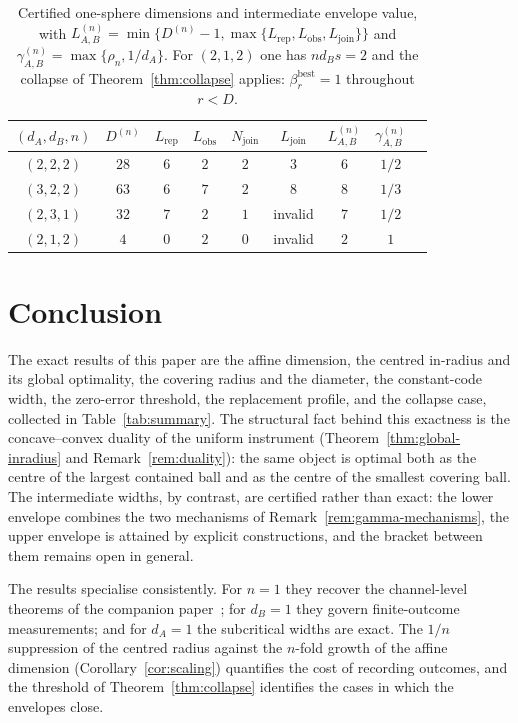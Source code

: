 \documentclass[11pt,a4paper]{article}
\begin{document}
\begin{table}[t]
\centering
\small
\setlength{\tabcolsep}{4pt}
\begin{tabular}{ccccccccc}
\toprule
$(d_A,d_B,n)$ & $D^{(n)}$ & $L_{\mathrm{rep}}$ & $L_{\mathrm{obs}}$ & $N_{\mathrm{join}}$ & $L_{\mathrm{join}}$ & $L_{A,B}^{(n)}$ & $\gamma_{A,B}^{(n)}$\\
\midrule
$(2,2,2)$ & $28$ & $6$ & $2$ & $2$ & $3$ & $6$ & $1/2$\\
$(3,2,2)$ & $63$ & $6$ & $7$ & $2$ & $8$ & $8$ & $1/3$\\
$(2,3,1)$ & $32$ & $7$ & $2$ & $1$ & invalid & $7$ & $1/2$\\
$(2,1,2)$ & $4$  & $0$ & $2$ & $0$ & invalid & $2$ & $1$\\
\bottomrule
\end{tabular}
\caption{Certified one-sphere dimensions and intermediate envelope value, with $L_{A,B}^{(n)}=\min\{D^{(n)}-1,\max\{L_{\mathrm{rep}},L_{\mathrm{obs}},L_{\mathrm{join}}\}\}$ and $\gamma_{A,B}^{(n)}=\max\{\rho_n,1/d_A\}$. For $(2,1,2)$ one has $nd_Bs=2$ and the collapse of Theorem~\ref{thm:collapse} applies: $\beta_r^{\mathrm{best}}=1$ throughout $r<D$.}
\label{tab:thresholds}
\end{table}

\section{Conclusion}
\label{sec:conclusion}

The exact results of this paper are the affine dimension, the centred in-radius and its global optimality, the covering radius and the diameter, the constant-code width, the zero-error threshold, the replacement profile, and the collapse case, collected in Table~\ref{tab:summary}. The structural fact behind this exactness is the concave--convex duality of the uniform instrument (Theorem~\ref{thm:global-inradius} and Remark~\ref{rem:duality}): the same object is optimal both as the centre of the largest contained ball and as the centre of the smallest covering ball. The intermediate widths, by contrast, are certified rather than exact: the lower envelope combines the two mechanisms of Remark~\ref{rem:gamma-mechanisms}, the upper envelope is attained by explicit constructions, and the bracket between them remains open in general.

The results specialise consistently. For $n=1$ they recover the channel-level theorems of the companion paper~\cite{CompanionChannels}; for $d_B=1$ they govern finite-outcome measurements; and for $d_A=1$ the subcritical widths are exact. The $1/n$ suppression of the centred radius against the $n$-fold growth of the affine dimension (Corollary~\ref{cor:scaling}) quantifies the cost of recording outcomes, and the threshold of Theorem~\ref{thm:collapse} identifies the cases in which the envelopes close.
\end{document}
